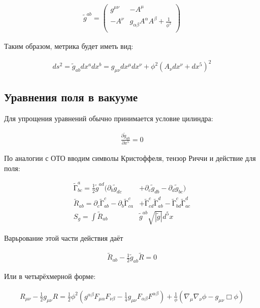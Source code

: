 \documentclass[a4paper,14pt]{article}
\begin{document}
	\begin{align*}
	 	\tilde g^{ab} =
		\left( \begin{array}{cc}
			g^{ \mu \nu } & - A^{\mu}                                                  \\
			- A^{ \nu }   &  g_{\alpha \beta} A^{\alpha} A^{\beta} + \frac{1}{\phi^2}  \\
		\end{array} \right)
	\end{align*}

	Таким образом, метрика будет иметь вид:

	\begin{align*}
	 	ds^2 = \tilde g_{ab} dx^a dx^b = g_{\mu \nu} dx^{\mu} dx^{\nu} + \phi^2 (A_{\nu} dx^{\nu} + dx^5)^2
	\end{align*}

\subsection*{Уравнения поля в вакууме}

	Для упрощения уравнений обычно принимается условие цилиндра:

	\begin{align*}
	 	\frac{ \partial \tilde g_{ab} }{\partial x^5} = 0
	\end{align*}

	По аналогии с ОТО вводим символы Кристоффеля, тензор Риччи и действие для поля:

	\begin{align*}
	 	\tilde{Г}_{bc}^a= \frac{1}{2} \tilde g^{ad} ( \partial_b \tilde g_{dc}& + \partial_c \tilde g_{db} - \partial_d \tilde g_{bc}) \\
	 	\tilde{R}_{ab} = \partial_c \tilde{Г}_{ab}^c - \partial_b \tilde{Г}_{ca}^c & + \tilde{Г}_{cd}^c \tilde{Г}_{ab}^d - \tilde{Г}_{bd}^c \tilde{Г}_{ac}^d \\
	 	S_g = \int \tilde{R}_{ab} & \tilde{g}^{ab} \sqrt{ |\tilde{g}| } d^5 x
	\end{align*}

	Варьрование этой части действия даёт

	\begin{align*}
	 	\tilde{R}_{ab} - \frac{1}{2} \tilde g_{ab} \tilde R = 0
	\end{align*}

	Или в четырёхмерной форме:

	\begin{align*}
	 	{R}_{\mu \nu} - \frac{1}{2} g_{\mu \nu} R = \frac{1}{2} \phi^2 ( g^{\alpha \beta } F_{\mu \alpha} F_{\nu \beta} - \frac{1}{4} g_{\mu \nu} F_{\alpha \beta} F^{\alpha \beta} ) + \frac{1}{\phi}(\nabla_{\mu} \nabla_{\nu} \phi - g_{\mu \nu} \Box \phi)
	\end{align*}
\end{document}
